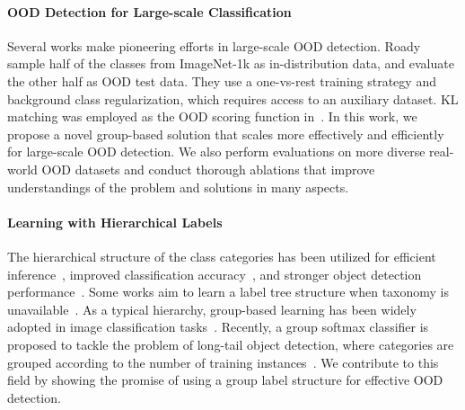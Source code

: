 \documentclass[final]{cvpr}
\begin{document}
\paragraph{OOD Detection for Large-scale Classification}
Several works make pioneering efforts in large-scale OOD detection. Roady~\etal~\cite{roady2019outofdistribution} sample half of the classes from ImageNet-1k as in-distribution data, and evaluate the other half as OOD test data. They use a one-vs-rest training strategy and background class regularization, which requires access to an auxiliary dataset. KL matching was employed as the OOD scoring function in~\cite{hendrycks2019benchmark}. In this work, we propose a novel group-based solution that scales more effectively and efficiently for large-scale OOD detection. We also perform evaluations on more diverse real-world OOD datasets and conduct thorough ablations that improve understandings of the problem and solutions in many aspects.

\vspace{-0.4cm}
\paragraph{Learning with Hierarchical Labels} The hierarchical structure of the class categories has been utilized for efficient inference~\cite{deng2011fast,liu2013probabilistic}, improved classification accuracy~\cite{deng2014large}, and stronger object detection performance~\cite{redmon2017yolo9000}. Some works aim to learn a label tree structure when taxonomy is unavailable~\cite{bengio2010label,deng2011fast,liu2013probabilistic}. As a typical hierarchy, group-based learning has been widely adopted in image classification tasks~\cite{hinton2015distilling,ahmed2016network,yan2015hd,warde2014self,gross2017hard}. Recently, a group softmax classifier is proposed to tackle the problem of long-tail object detection, where categories are grouped according to the number of training instances~\cite{li2020overcoming}. We contribute to this field by showing the promise of using a group label structure for effective OOD detection.







\vspace{-0.2cm}
\end{document}
